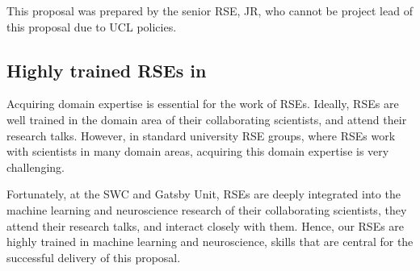 This proposal was prepared by the senior RSE, JR, who cannot be project lead of
this proposal due to UCL policies.

\subsection*{Highly trained RSEs in }

Acquiring domain expertise is essential for the work of RSEs. Ideally, RSEs
are well trained in the domain area of their collaborating scientists, and
attend their research talks. However, in standard university RSE groups, where
RSEs work with scientists in many domain areas, acquiring this domain expertise
is very challenging.

Fortunately, at the SWC and Gatsby Unit, RSEs are deeply integrated into the
machine learning and neuroscience research of their collaborating scientists,
they attend their research talks, and interact closely with them.  Hence, our
RSEs are highly trained in machine learning and neuroscience, skills that are
central for the successful delivery of this proposal.
